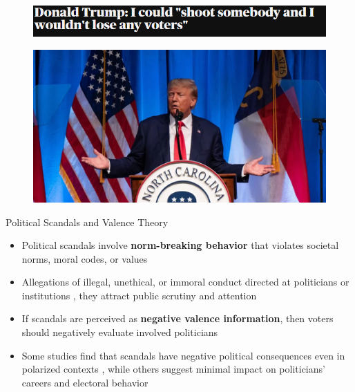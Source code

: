 \documentclass[9pt, aspectratio=169]{beamer}
\newcommand{\customcite}[1]{\textcolor{blue}{\footnotesize\parencite{#1}}}
\newcommand{\customcites}[1]{\textcolor{blue}{\footnotesize\parencites{#1}}}
\begin{document}

\begin{frame} %
    \begin{figure}
        \centering
        \includegraphics[width=\linewidth]{images/Trump1.png}
        \label{fig:trump1}
    \end{figure}
        \begin{figure}
        \centering
        \includegraphics[width=0.7\linewidth]{images/Trump2.jpg}
        \label{fig:trump2}
    \end{figure}
\end{frame}

\begin{frame}{Political Scandals and Valence Theory}
    \begin{itemize}
        \item Political scandals involve \textbf{norm-breaking behavior} that violates societal norms, moral codes, or values \customcites{genovese_2010, Thompson_2013} \vspace{0.3cm}
        \item Allegations of illegal, unethical, or immoral conduct directed at politicians or institutions \customcite{Rottinghaus_2023}, they attract public scrutiny and attention \customcites{Thompson_2013, Marion_2010}\vspace{0.2cm}
        \item If scandals are perceived as \textbf{negative valence information}, then voters should negatively evaluate involved politicians \customcites{doherty2014does, Rottinghaus_2023} \vspace{0.3cm}
        \item Some studies find that scandals have negative political consequences even in polarized contexts \customcites{darr2019collision, wolsky2022scandal}, while others suggest minimal impact on politicians' careers and electoral behavior \customcites{funck2021partisanship, Lee_2023}
    \end{itemize}
\end{frame}
\end{document}
